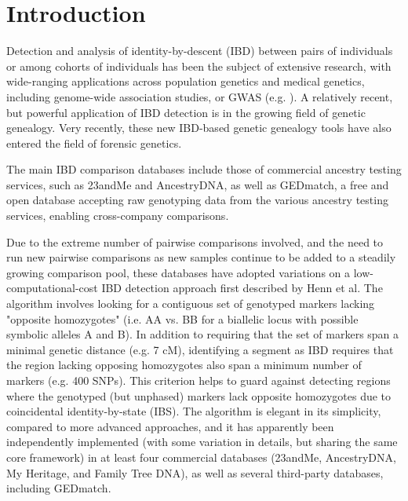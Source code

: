 \documentclass{article}
\begin{document}
\section{Introduction}
Detection and analysis of identity-by-descent (IBD) between pairs of individuals or among cohorts of individuals has been the subject of extensive research, with wide-ranging applications across population genetics and medical genetics, including genome-wide association studies, or GWAS (e.g. \citep{GERMLINE} \citep{PLINK} \citep{Albrechtsen} \citep{beagle} \citep{speeDB} \citep{Parente2}  \citep{fastIBD} \citep{ERSA} \citep{ERSA2} \citep{decode} \citep{Parente}). A relatively recent, but powerful application of IBD detection is in the growing field of genetic genealogy.\citep{23andMe} Very recently, these new IBD-based genetic genealogy tools have also entered the field of forensic genetics.\citep{GSK}

The main IBD comparison databases include those of commercial ancestry testing services, such as 23andMe and AncestryDNA, as well as GEDmatch, a free and open database accepting raw genotyping data from the various ancestry testing services, enabling cross-company comparisons.\citep{GEDmatch}

Due to the extreme number of pairwise comparisons involved, and the need to run new pairwise comparisons as new samples continue to be added to a steadily growing comparison pool, these databases have adopted variations on a low-computational-cost IBD detection approach first described by Henn et al.\citep{23andMe} The algorithm involves looking for a contiguous set of genotyped markers lacking "opposite homozygotes" (i.e. AA vs. BB for a biallelic locus with possible symbolic alleles A and B). In addition to requiring that the set of markers span a minimal genetic distance (e.g. 7 cM), identifying a segment as IBD requires that the region lacking opposing homozygotes also span a minimum number of markers (e.g. 400 SNPs). This criterion helps to guard against detecting regions where the genotyped (but unphased) markers lack opposite homozygotes due to coincidental identity-by-state (IBS). The algorithm is elegant in its simplicity, compared to more advanced approaches, and it has apparently been independently implemented (with some variation in details, but sharing the same core framework) in at least four commercial databases (23andMe, AncestryDNA, My Heritage, and Family Tree DNA), as well as several third-party databases, including GEDmatch.
\end{document}
